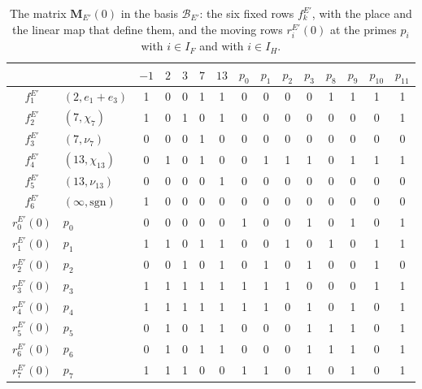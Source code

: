 \documentclass[12pt,oneside,openany]{book}
\theoremstyle{definition}
\theoremstyle{plain}
\numberwithin{equation}{chapter}
\theoremstyle{plain}
\theoremstyle{definition}
\theoremstyle{remark}
\newcommand{\cB}{\mathcal B}
\begin{document}
\begin{table}[htbp]
\centering
\caption{The matrix $\mathbf M_{E'}(0)$ in the basis $\cB_{E'}$: the six
fixed rows $f^{E'}_k$, with the place and the linear map that define them, and the
moving rows $r^{E'}_i(0)$ at the primes $p_i$ with $i\in I_F$ and with
$i\in I_H$.}
\label{tab:r7-MEp}
\small
\setlength{\tabcolsep}{4pt}
\begin{tabular}{cl@{\hspace{10pt}}ccccc@{\hspace{14pt}}cccccccc}
\toprule
 & & $-1$ & $2$ & $3$ & $7$ & $13$ & $p_0$ & $p_1$ & $p_2$ & $p_3$ & $p_8$ & $p_9$ & $p_{10}$ & $p_{11}$\\
\midrule
$f^{E'}_1$ & $(2,e_1+e_3)$ & 1 & 0 & 0 & 1 & 1 & 0 & 0 & 0 & 0 & 1 & 1 & 1 & 1 \\
$f^{E'}_2$ & $(7,\chi_7)$ & 1 & 0 & 1 & 0 & 1 & 0 & 0 & 0 & 0 & 0 & 0 & 0 & 1 \\
$f^{E'}_3$ & $(7,\nu_7)$ & 0 & 0 & 0 & 1 & 0 & 0 & 0 & 0 & 0 & 0 & 0 & 0 & 0 \\
$f^{E'}_4$ & $(13,\chi_{13})$ & 0 & 1 & 0 & 1 & 0 & 0 & 1 & 1 & 1 & 0 & 1 & 1 & 1 \\
$f^{E'}_5$ & $(13,\nu_{13})$ & 0 & 0 & 0 & 0 & 1 & 0 & 0 & 0 & 0 & 0 & 0 & 0 & 0 \\
$f^{E'}_6$ & $(\infty,\mathrm{sgn})$ & 1 & 0 & 0 & 0 & 0 & 0 & 0 & 0 & 0 & 0 & 0 & 0 & 0 \\
\addlinespace
$r^{E'}_0(0)$ & $p_0$ & 0 & 0 & 0 & 0 & 0 & 1 & 0 & 0 & 1 & 0 & 1 & 0 & 1 \\
$r^{E'}_1(0)$ & $p_1$ & 1 & 1 & 0 & 1 & 1 & 0 & 0 & 1 & 0 & 1 & 0 & 1 & 1 \\
$r^{E'}_2(0)$ & $p_2$ & 0 & 0 & 1 & 0 & 1 & 0 & 1 & 0 & 1 & 0 & 0 & 1 & 0 \\
$r^{E'}_3(0)$ & $p_3$ & 1 & 1 & 1 & 1 & 1 & 1 & 1 & 1 & 0 & 0 & 0 & 1 & 1 \\
\addlinespace
$r^{E'}_4(0)$ & $p_4$ & 1 & 1 & 1 & 1 & 1 & 1 & 1 & 0 & 1 & 0 & 1 & 0 & 1 \\
$r^{E'}_5(0)$ & $p_5$ & 0 & 1 & 0 & 1 & 1 & 0 & 0 & 0 & 1 & 1 & 1 & 0 & 1 \\
$r^{E'}_6(0)$ & $p_6$ & 0 & 1 & 0 & 1 & 1 & 0 & 0 & 0 & 1 & 1 & 1 & 0 & 1 \\
$r^{E'}_7(0)$ & $p_7$ & 1 & 1 & 1 & 0 & 0 & 1 & 1 & 0 & 1 & 0 & 1 & 0 & 1 \\
\bottomrule
\end{tabular}
\end{table}
\end{document}
